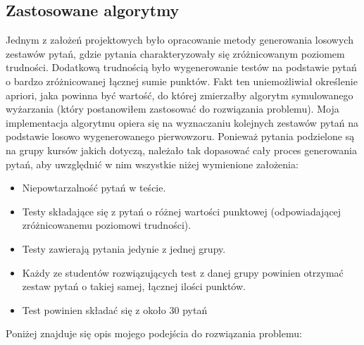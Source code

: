 \documentclass[a4paper, titlepage]{article}
\begin{document}
	\subsection{Zastosowane algorytmy}
	Jednym z założeń projektowych było opracowanie metody generowania losowych zestawów pytań, gdzie pytania charakteryzowały się zróżnicowanym poziomem trudności. Dodatkową trudnością było wygenerowanie testów na podstawie pytań o bardzo zróżnicowanej łącznej sumie punktów. Fakt ten uniemożliwiał określenie apriori, jaka powinna być wartość, do której zmierzałby algorytm symulowanego wyżarzania (który postanowiłem zastosować do rozwiązania problemu). Moja implementacja algorytmu opiera się na wyznaczaniu kolejnych zestawów pytań na podstawie losowo wygenerowanego pierwowzoru. Ponieważ pytania podzielone są na grupy kursów jakich dotyczą, należało tak dopasować cały proces generowania pytań, aby uwzględnić w nim wszystkie niżej wymienione założenia:
	\begin{itemize}
	\item Niepowtarzalność pytań w teście.
	\item Testy składające się z pytań o różnej wartości punktowej (odpowiadającej zróżnicowanemu poziomowi trudności).
	\item Testy zawierają pytania jedynie z jednej grupy.
	\item Każdy ze studentów rozwiązujących test z danej grupy powinien otrzymać zestaw pytań o takiej samej, łącznej ilości punktów.
	\item Test powinien składać się z około 30 pytań
	\end{itemize}

	Poniżej znajduje się opis mojego podejścia do rozwiązania problemu:
\end{document}
